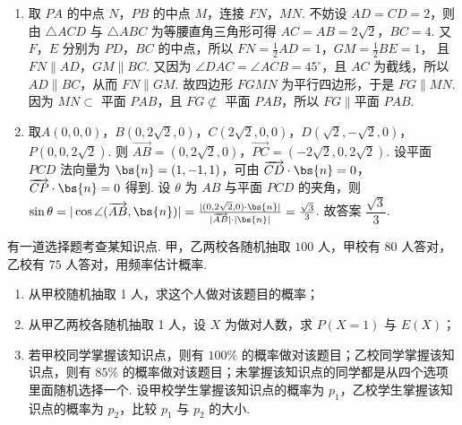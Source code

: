\begin{solution}
\begin{enumerate}
\item 取 \(PA\) 的中点 \(N\)，\(PB\) 的中点 \(M\)，连接 \(FN\)，\(MN\). 不妨设 \(AD=CD=2\)，则由 \(\triangle ACD\) 与 \(\triangle ABC\) 为等腰直角三角形可得 \(AC=AB=2\sqrt2\)，\(BC=4\). 又 \(F\)，\(E\) 分别为 \(PD\)，\(BC\) 的中点，所以 \(FN=\frac12 AD=1\)，\(GM=\frac12 BE=1\)，
且 \(FN\parallel AD\)，\(GM\parallel BC\). 又因为 \(\angle DAC=\angle ACB=45^\circ\)，且 \(AC\) 为截线，所以 \(AD\parallel BC\)，从而 \(FN\parallel GM\). 故四边形 \(FGMN\) 为平行四边形，于是
\(FG\parallel MN\). 因为 \(MN\subset\) 平面 \(PAB\)，且 \(FG\not\subset\) 平面 \(PAB\)，所以 \(FG\parallel \text{平面 }PAB\).

\item 取\(A(0,0,0)\)，\(B(0,2\sqrt2,0)\)，\(C(2\sqrt2,0,0)\)，\(D(\sqrt2,-\sqrt2,0)\)，\(P(0,0,2\sqrt2)\).
则 \(\overrightarrow{AB}=(0,2\sqrt2,0)\)，\(\overrightarrow{PC}=(-2\sqrt2,0,2\sqrt2)\). 设平面 \(PCD\) 法向量为 \(\bs{n}=(1,-1,1)\)，可由 \(\overrightarrow{CD}\cdot\bs{n}=0\)，\(\overrightarrow{CP}\cdot\bs{n}=0\) 得到. 设 \(\theta\) 为 \(AB\) 与平面 \(PCD\) 的夹角，则
\(\sin\theta=|\cos\angle(\overrightarrow{AB},\bs{n})|=\frac{|(0,2\sqrt2,0)\cdot\bs{n}|}{|\overrightarrow{AB}|\cdot|\bs{n}|}=\frac{\sqrt3}{3}\).
故答案 \(\dfrac{\sqrt3}{3}\).
\end{enumerate}
\end{solution}

\begin{problem}
有一道选择题考查某知识点. 甲，乙两校各随机抽取 \(100\) 人，甲校有 \(80\) 人答对，乙校有 \(75\) 人答对，用频率估计概率.

\begin{enumerate}
    \item 从甲校随机抽取 1 人，求这个人做对该题目的概率；
    \item 从甲乙两校各随机抽取 1 人，设 \(X\) 为做对人数，求 \(P(X=1)\) 与 \(E(X)\)；
    \item 若甲校同学掌握该知识点，则有 \(100\%\) 的概率做对该题目；乙校同学掌握该知识点，则有 \(85\%\) 的概率做对该题目；未掌握该知识点的同学都是从四个选项里面随机选择一个. 设甲校学生掌握该知识点的概率为 \(p_1\)，乙校学生掌握该知识点的概率为 \(p_2\)，比较 \(p_1\) 与 \(p_2\) 的大小.
\end{enumerate}
\end{problem}

